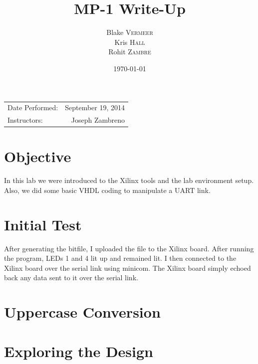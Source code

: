 \documentclass{article}
\title{MP-1 Write-Up} %
\author{Blake \textsc{Vermeer}\\
		Kris \textsc{Hall}\\
		Rohit \textsc{Zambre}} %
\date{\today} %
\begin{document}
\maketitle %

\begin{center}
\begin{tabular}{l r}
Date Performed: & September 19, 2014 \\ %
Instructors: & Joseph Zambreno %
\end{tabular}
\end{center}




\section{Objective}
In this lab we were introduced to the Xilinx tools and the lab environment setup. Also, we did some basic VHDL coding to manipulate a UART link.


\section{Initial Test}
After generating the bitfile, I uploaded the file to the Xilinx board. After running the program, LEDs 1 and 4 lit up and remained lit. I then connected to the Xilinx board over the serial link using minicom. The Xilinx board simply echoed back any data sent to it over the serial link. 


\section{Uppercase Conversion}


\section{Exploring the Design}
\end{document}
